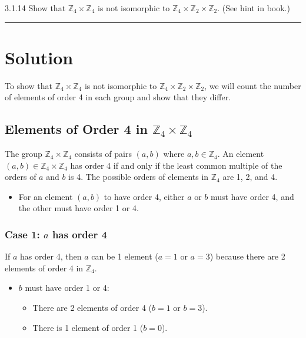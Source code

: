 \documentclass[12pt]{amsart}
\theoremstyle{definition}
\numberwithin{equation}{section}
\newcommand{\Z}{\mathbb{Z}}
\begin{document}
\begin{exercise}{3.1.14} Show that \(\Z_4 \times \Z_4\) is not isomorphic to \(\Z_4 \times \Z_2 \times \Z_2\). (See hint in book.)
    
    \noindent\rule{\linewidth}{1pt}

    \section*{Solution}

    To show that \(\Z_4 \times \Z_4\) is not isomorphic to \(\Z_4 \times \Z_2 \times \Z_2\), we will count the number of elements of order 4 in each group and show that they differ.

    \subsection*{Elements of Order 4 in \(\Z_4 \times \Z_4\)}

    The group \(\Z_4 \times \Z_4\) consists of pairs \((a, b)\) where \(a, b \in \Z_4\). An element \((a, b) \in \Z_4 \times \Z_4\) has order 4 if and only if the least common multiple of the orders of \(a\) and \(b\) is 4. The possible orders of elements in \(\Z_4\) are 1, 2, and 4.

    \begin{itemize}
        \item For an element \((a, b)\) to have order 4, either \(a\) or \(b\) must have order 4, and the other must have order 1 or 4.
    \end{itemize}

    \subsubsection*{Case 1: \(a\) has order 4}

    If \(a\) has order 4, then \(a\) can be 1 element (\(a = 1\) or \(a = 3\)) because there are 2 elements of order 4 in \(\Z_4\).

    \begin{itemize}
        \item \(b\) must have order 1 or 4:
            \begin{itemize}
                \item There are 2 elements of order 4 (\(b = 1\) or \(b = 3\)).
                \item There is 1 element of order 1 (\(b = 0\)).
            \end{itemize}
    \end{itemize}


\end{exercise}
\end{document}
